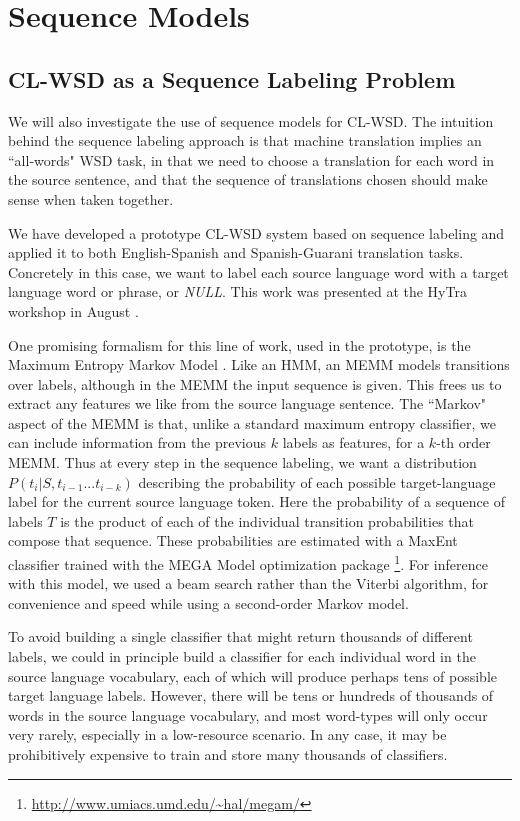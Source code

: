 \chapter{Sequence Models}
\label{chap:sequence}

\section{CL-WSD as a Sequence Labeling Problem}
We will also investigate the use of sequence models for CL-WSD.
The intuition behind the sequence labeling approach is that machine translation
implies an ``all-words" WSD task, in that we need to choose a translation for
each word in the source sentence, and that the sequence of translations chosen
should make sense when taken together.

We have developed a prototype CL-WSD system based on sequence labeling and
applied it to both English-Spanish and Spanish-Guarani translation tasks.
Concretely in this case, we want to label each source language word with a
target language word or phrase, or \emph{NULL}.
This work was presented at the HyTra workshop in August
\cite{rudnick-gasser:2013:HyTra-2013}.

One promising formalism for this line of work, used in the prototype, is the
Maximum Entropy Markov Model \cite{icml00/mccallum}.
Like an HMM, an MEMM models transitions over labels, although in the MEMM the
input sequence is given.
This frees us to extract any features we like from the source language
sentence. The ``Markov" aspect of the MEMM is that, unlike a standard maximum
entropy classifier, we can include information from the previous $k$ labels as
features, for a $k$-th order MEMM.
Thus at every step in the sequence labeling, we want a distribution
$P(t_i | S, t_{i-1}...t_{i-k})$ describing the probability of each possible
target-language label for the current source language token.
Here the probability of a sequence of labels $T$ is the product of each of the
individual transition probabilities that compose that sequence.
These probabilities are estimated with a MaxEnt classifier trained with 
the MEGA Model optimization package
\footnote{\url{http://www.umiacs.umd.edu/~hal/megam/}}.
For inference with this model, we used a beam search rather than the Viterbi
algorithm, for convenience and speed while using a second-order Markov model.

To avoid building a single classifier that might return
thousands of different labels, we could in principle build a classifier for
each individual word in the source language vocabulary, each of which will
produce perhaps tens of possible target language labels. However, there will be
tens or hundreds of thousands of words in the source language vocabulary, and
most word-types will only occur very rarely, especially in a low-resource
scenario.
In any case, it may be prohibitively expensive to train and store many
thousands of classifiers.

